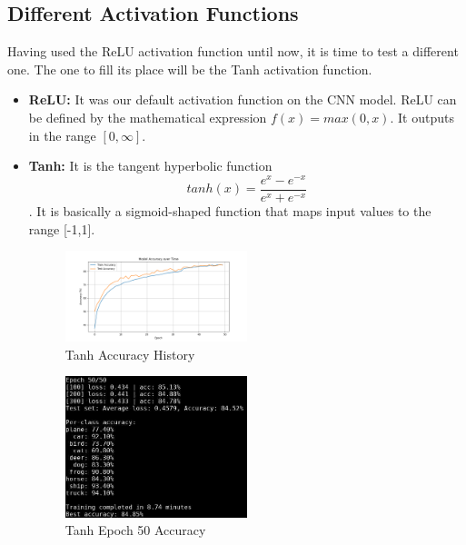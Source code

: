 \subsection{Different Activation Functions}
Having used the ReLU activation function until now, it is time to test a different one. The one to 
fill its place will be the Tanh activation function.\\
\begin{itemize}
    \item \textbf{ReLU:} It was our default activation function on the CNN model. ReLU can be 
    defined by the mathematical expression $ f(x) = max(0,x) $. It outputs in the range $[0,\infty]$.
    \item \textbf{Tanh:} It is the tangent hyperbolic function 
    $$ tanh(x) = \frac{e^{x} - e^{-x}}{e^{x} + e^{-x}} $$.
    It is basically a sigmoid-shaped function that maps input values to the range [-1,1].
    \begin{figure}[H]
        \centering
        \includegraphics[width=0.5\textwidth]{media/cifar10_cnn_tanh_accuracy.png}
        \caption{Tanh Accuracy History}
    \end{figure}
    \begin{figure}[H]
        \centering
        \includegraphics[width=0.5\textwidth]{media/cnn_tanh_epoch_50.png}
        \caption{Tanh Epoch 50 Accuracy}
    \end{figure}
\end{itemize}


